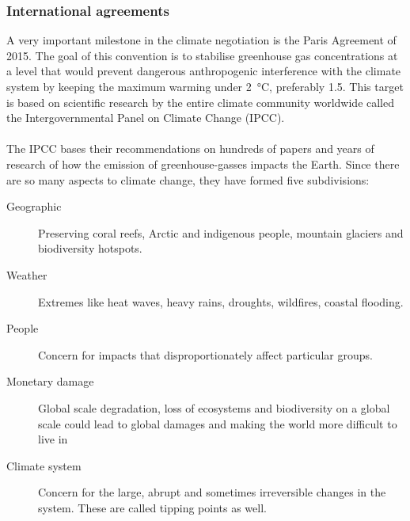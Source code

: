 \documentclass[../summary.tex]{subfiles}
\begin{document}
\subsubsection{International agreements}
A very important milestone in the climate negotiation is the Paris Agreement of 2015. The goal of this convention is to stabilise greenhouse gas concentrations at a level that would prevent dangerous anthropogenic interference with the climate system by keeping the maximum warming under \SI{2}{\degreeCelsius}, preferably 1.5. This target is based on scientific research by the entire climate community worldwide called the Intergovernmental Panel on Climate Change (IPCC).
\\\\
The IPCC bases their recommendations on hundreds of papers and years of research of how the emission of greenhouse-gasses impacts the Earth. Since there are so many aspects to climate change, they have formed five subdivisions:
\begin{description}
	\item[Geographic] Preserving coral reefs, Arctic and indigenous people, mountain glaciers and biodiversity hotspots.
	\item[Weather] Extremes like heat waves, heavy rains, droughts, wildfires, coastal flooding.
	\item[People] Concern for impacts that disproportionately affect particular groups.
	\item[Monetary damage] Global scale degradation, loss of ecosystems and biodiversity on a global scale could lead to global damages and making the world more difficult to live in
	\item[Climate system] Concern for the large, abrupt and sometimes irreversible changes in the system. These are called tipping points as well.
\end{description}

\newpage
\end{document}
